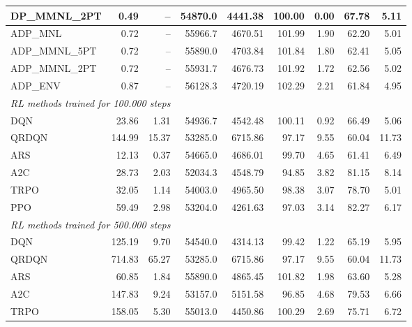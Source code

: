 \begin{samepage}
\begin{center}
\begin{tabular}{l|rr|rr|rr|rr}
    DP\_MMNL\_2PT &     0.49 &    -- &    54870.0 &    4441.38 &  100.00 &    0.00 &   67.78 &    5.11 \\
    \midrule
    ADP\_MNL     &     0.72 &    -- &    55966.7 &    4670.51 &  101.99 &    1.90 &   62.20 &    5.01 \\
    ADP\_MMNL\_5PT &     0.72 &    -- &    55890.0 &    4703.84 &  101.84 &    1.80 &   62.41 &    5.05 \\
    ADP\_MMNL\_2PT &     0.72 &    -- &    55931.7 &    4676.73 &  101.92 &    1.72 &   62.56 &    5.02 \\
    ADP\_ENV     &     0.87 &    -- &    56128.3 &    4720.19 &  102.29 &    2.21 &   61.84 &    4.95 \\
    \midrule
    \multicolumn{9}{l}{\textit{RL methods trained for 100.000 steps}} \\
    \midrule
    DQN          &    23.86 &     1.31 &    54936.7 &    4542.48 &  100.11 &    0.92 &   66.49 &    5.06 \\
    QRDQN        &   144.99 &    15.37 &    53285.0 &    6715.86 &   97.17 &    9.55 &   60.04 &   11.73 \\
    ARS          &    12.13 &     0.37 &    54665.0 &    4686.01 &   99.70 &    4.65 &   61.41 &    6.49 \\
    A2C          &    28.73 &     2.03 &    52034.3 &    4548.79 &   94.85 &    3.82 &   81.15 &    8.14 \\
    TRPO         &    32.05 &     1.14 &    54003.0 &    4965.50 &   98.38 &    3.07 &   78.70 &    5.01 \\
    PPO          &    59.49 &     2.98 &    53204.0 &    4261.63 &   97.03 &    3.14 &   82.27 &    6.17 \\
    \midrule
    \multicolumn{9}{l}{\textit{RL methods trained for 500.000 steps}} \\
    \midrule
    DQN          &   125.19 &     9.70 &    54540.0 &    4314.13 &   99.42 &    1.22 &   65.19 &    5.95 \\
    QRDQN        &   714.83 &    65.27 &    53285.0 &    6715.86 &   97.17 &    9.55 &   60.04 &   11.73 \\
    ARS          &    60.85 &     1.84 &    55890.0 &    4865.45 &  101.82 &    1.98 &   63.60 &    5.28 \\
    A2C          &   147.83 &     9.24 &    53157.0 &    5151.58 &   96.85 &    4.68 &   79.53 &    6.66 \\
    TRPO         &   158.05 &     5.30 &    55013.0 &    4450.86 &  100.29 &    2.69 &   75.71 &    6.72 \\

\end{tabular}
\end{center}
\end{samepage}

